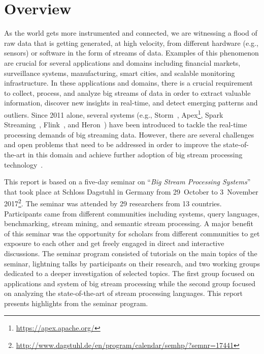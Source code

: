 \section{Overview}\label{sec:overview}

As the world gets more instrumented and connected, we are witnessing a
flood of raw data that is getting generated, at high velocity,
from different hardware (e.g., sensors) or software in the form of
streams of data. Examples of this phenomenon are crucial for several
applications and domains including financial markets, surveillance
systems, manufacturing, smart cities, and scalable monitoring
infrastructure. In these applications and domains, there is a crucial
requirement to collect, process, and analyze big streams of data in
order to extract valuable information, discover new insights in
real-time, and detect emerging patterns and outliers. Since 2011
alone, several systems (e.g.,
\textsf{\small Storm}~\cite{toshniwal_et_al_2014},
\textsf{\small Apex}\footnote{\url{https://apex.apache.org/}},
\textsf{\small Spark Streaming}~\cite{zaharia_et_al_2013},
\textsf{\small Flink}~\cite{carbone_et_al_2015}, and
\textsf{\small Heron}~\cite{kulkarni_et_al_2015}) have
been introduced to tackle the real-time processing demands of big streaming data. However, there are several challenges and open problems that need to be addressed in order to improve the state-of-the-art in this domain and achieve further adoption of big stream processing technology~\cite{sakr2016big}.

This report is based on a five-day seminar on ``\emph{Big Stream
  Processing Systems}'' that took place at Schloss Dagstuhl in Germany
from 29~October to 3~November 2017\footnote{\url{http://www.dagstuhl.de/en/program/calendar/semhp/?semnr=17441}}. The seminar was attended by 29 researchers from  13 countries. Participants came from different communities including systems, query languages, benchmarking, stream mining, and semantic stream processing. A major benefit of this seminar was the opportunity for scholars from different communities to get exposure to each other and get freely engaged in direct and interactive discussions. The seminar program consisted of tutorials on the main topics of the seminar, lightning talks by participants on their research, and two working groups dedicated to a deeper investigation of selected topics. The first group focused on applications and system of big stream processing while the second group focused on analyzing the state-of-the-art of stream processing languages. This report presents highlights from the seminar program.
